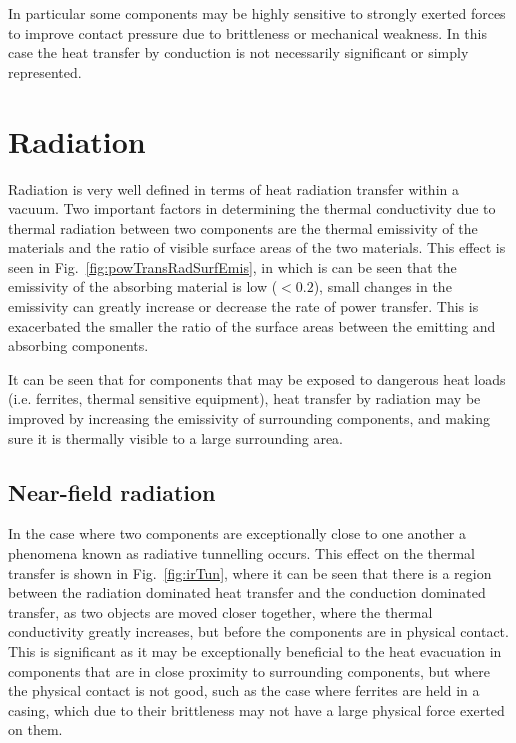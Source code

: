 In particular some components may be highly sensitive to strongly exerted forces to improve contact pressure due to brittleness or mechanical weakness. In this case the heat transfer by conduction is not necessarily significant or simply represented.

\section{Radiation}

Radiation is very well defined in terms of heat radiation transfer within a vacuum. Two important factors in determining the thermal conductivity due to thermal radiation between two components are the thermal emissivity of the materials and the ratio of visible surface areas of the two materials. This effect is seen in Fig.~\ref{fig:powTransRadSurfEmis}, in which is can be seen that the emissivity of the absorbing material is low ($< 0.2$), small changes in the emissivity can greatly increase or decrease the rate of power transfer. This is exacerbated the smaller the ratio of the surface areas between the emitting and absorbing components.

It can be seen that for components that may be exposed to dangerous heat loads (i.e. ferrites, thermal sensitive equipment), heat transfer by radiation may be improved by increasing the emissivity of surrounding components, and making sure it is thermally visible to a large surrounding area.

\subsection{Near-field radiation}

In the case where two components are exceptionally close to one another a phenomena known as radiative tunnelling occurs. This effect on the thermal transfer is shown in Fig.~\ref{fig:irTun}, where it can be seen that there is a region between the radiation dominated heat transfer and the conduction dominated transfer, as two objects are moved closer together, where the thermal conductivity greatly increases, but before the components are in physical contact. This is significant as it may be exceptionally beneficial to the heat evacuation in components that are in close proximity to surrounding components, but where the physical contact is not good, such as the case where ferrites are held in a casing, which due to their brittleness may not have a large physical force exerted on them.

